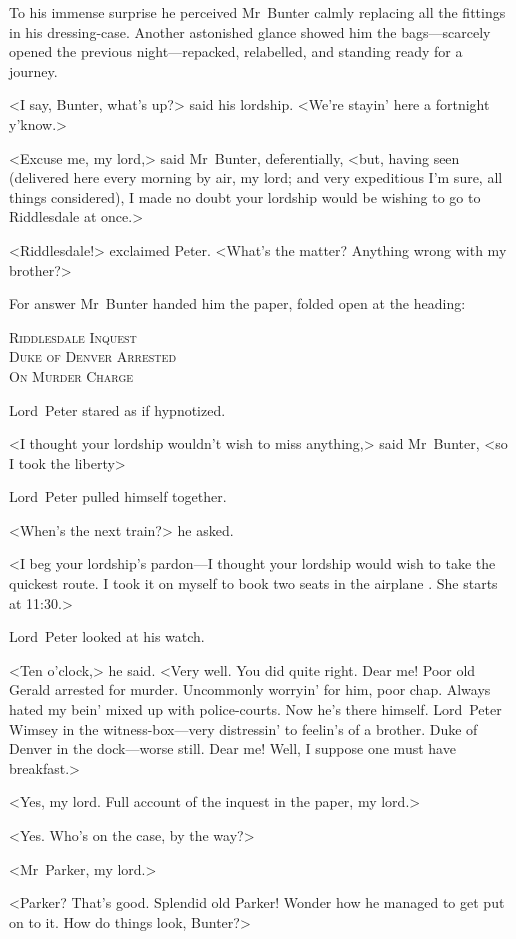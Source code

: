 To his immense surprise he perceived Mr~Bunter calmly replacing all the fittings in his dressing-case. Another astonished glance showed him the bags—scarcely opened the previous night—repacked, relabelled, and standing ready for a journey.

<I say, Bunter, what's up?> said his lordship. <We're stayin' here a fortnight y'know.>

<Excuse me, my lord,> said Mr~Bunter, deferentially, <but, having seen  (delivered here every morning by air, my lord; and very expeditious I'm sure, all things considered), I made no doubt your lordship would be wishing to go to Riddlesdale at once.>

<Riddlesdale!> exclaimed Peter. <What's the matter? Anything wrong with my brother?>

For answer Mr~Bunter handed him the paper, folded open at the heading:
\begin{center}
\textsc{Riddlesdale Inquest\\
Duke of Denver Arrested\\
On Murder Charge}
\end{center}


Lord~Peter stared as if hypnotized.

<I thought your lordship wouldn't wish to miss anything,> said Mr~Bunter, <so I took the liberty\longdash>

Lord~Peter pulled himself together.

<When's the next train?> he asked.

<I beg your lordship's pardon—I thought your lordship would wish to take the quickest route. I took it on myself to book two seats in the airplane . She starts at 11:30.>

Lord~Peter looked at his watch.

<Ten o'clock,> he said. <Very well. You did quite right. Dear me! Poor old Gerald arrested for murder. Uncommonly worryin' for him, poor chap.  Always hated my bein' mixed up with police-courts. Now he's there himself. Lord~Peter Wimsey in the witness-box—very distressin' to feelin's of a brother. Duke of Denver in the dock—worse still. Dear me! Well, I suppose one must have breakfast.>

<Yes, my lord. Full account of the inquest in the paper, my lord.>

<Yes. Who's on the case, by the way?>

<Mr~Parker, my lord.>

<Parker? That's good. Splendid old Parker! Wonder how he managed to get put on to it. How do things look, Bunter?>

